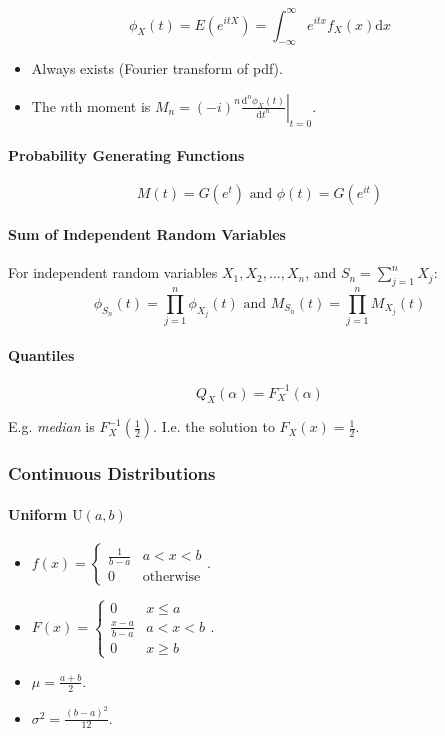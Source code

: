 \documentclass[twocolumn,english]{article}
\begin{document}
\[
\phi_{X}\left(t\right)=E\left(e^{itX}\right)=\int_{-\infty}^{\infty}e^{itx}f_{X}\left(x\right)\text{d}x
\]
\begin{itemize}
\item Always exists (Fourier transform of pdf).
\item The $n$th moment is $\left.M_{n}=\left(-i\right)^{n}\frac{\text{d}^{n}\phi_{X}\left(t\right)}{\text{d}t^{n}}\right\vert _{t=0}$.
\end{itemize}

\paragraph{Probability Generating Functions}

\[
M\left(t\right)=G\left(e^{t}\right)\text{ and }\phi\left(t\right)=G\left(e^{it}\right)
\]

\paragraph{Sum of Independent Random Variables}

For independent random variables $X_{1},X_{2},\dots,X_{n}$, and $S_{n}=\sum_{j=1}^{n}X_{j}$:
\[
\phi_{S_{n}}\left(t\right)=\prod_{j=1}^{n}\phi_{X_{j}}\left(t\right)\text{ and }M_{S_{n}}\left(t\right)=\prod_{j=1}^{n}M_{X_{j}}\left(t\right)
\]

\paragraph{Quantiles}

\[
Q_{X}\left(\alpha\right)=F_{X}^{-1}\left(\alpha\right)
\]

E.g. \emph{median} is $F_{X}^{-1}\left(\frac{1}{2}\right)$. I.e.
the solution to $F_{X}\left(x\right)=\frac{1}{2}$.

\subsubsection{Continuous Distributions}

\paragraph{Uniform $\text{U}\left(a,b\right)$}
\begin{itemize}
\item $f\left(x\right)=\begin{cases}
\frac{1}{b-a} & a<x<b\\
0 & \text{otherwise}
\end{cases}$.
\item $F\left(x\right)=\begin{cases}
0 & x\leq a\\
\frac{x-a}{b-a} & a<x<b\\
0 & x\geq b
\end{cases}$.
\item $\mu=\frac{a+b}{2}$.
\item $\sigma^{2}=\frac{\left(b-a\right)^{2}}{12}$.
\end{itemize}
\end{document}
